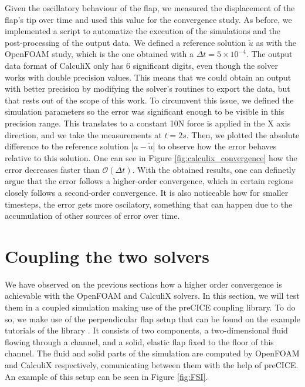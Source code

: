 \documentclass[
  english,        %
  font=times,     %
  onecolumn,      %
]{tumarticle}
\begin{document}
Given the oscillatory behaviour of the flap, we measured the displacement of the flap's tip over time and used this value for the convergence study. As before, we implemented a script to automatize the execution of the simulations and the post-processing of the output data. We defined a reference solution $\tilde{u}$ as with the OpenFOAM study, which is the one obtained with a $\Delta t = 5\times 10^{-4}$. The output data format of CalculiX only has 6 significant digits, even though the solver works with double precision values. This means that we could obtain an output with better precision by modifying the solver's routines to export the data, but that rests out of the scope of this work. To circumvent this issue, we defined the simulation parameters so the error was significant enough to be visible in this precision range. This translates to a constant 10N force is applied in the X axis direction, and we take the measurements at $t=2s$. Then, we plotted the absolute difference to the reference solution $|u - \tilde{u}|$ to observe how the error behaves relative to this solution. One can see in Figure \ref{fig:calculix_convergence} how the error decreases faster than $\mathcal{O}(\Delta t)$. With the obtained results, one can definetly argue that the error follows a higher-order convergence, which in certain regions closely follows a second-order convergence. It is also noticeable how for smaller timesteps, the error gets more oscilatory, something that can happen due to the accumulation of other sources of error over time. 


\section{Coupling the two solvers} \label{sec:FSI}

We have observed on the previous sections how a higher order convergence is achievable with the OpenFOAM and CalculiX solvers. In this section, we will test them in a coupled simulation making use of the preCICE coupling library. To do so, we make use of the perpendicular flap setup that can be found on the example tutorials of the library \cite{perpendicularFlap}. It consists of two components, a two-dimensional fluid flowing through a channel, and a solid, elastic flap fixed to the floor of this channel. The fluid and solid parts of the simulation are computed by OpenFOAM and CalculiX respectively, comunicating between them with the help of preCICE. An example of this setup can be seen in Figure \ref{fig:FSI}.
\end{document}
